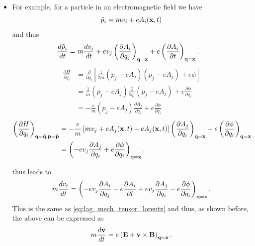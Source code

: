 \documentclass[oneside,a4paper,11pt]{report}
\begin{document}
\begin{itemize}
\item For example, for a particle in an electromagnetic field we have
\begin{equation}
\tilde{p}_i = mv_i + e A_i(\mathbf{x},t)
\end{equation}
and thus
\begin{align}
\frac{d \tilde{p}_i}{dt} & = m \frac{d v_i}{dt} + e v_j \left ( \frac{\partial A_i}{\partial q_j} \right)_{\mathbf{q} = \mathbf{x}} + e \left ( \frac{ \partial A_i}{\partial t} \right)_{\mathbf{q} = \mathbf{x}}.
\end{align}
\begin{align}
\frac{\partial H}{\partial q_i} &= \frac{\partial}{\partial q_i} \left [ \frac{1}{2m} (p_j -eA_j) (p_j -eA_j) + e\phi \right] \nonumber \\
& = \frac{1}{m} (p_j -eA_j) \frac{\partial}{\partial q_i} (p_j - eA_j) + e\frac{\partial \phi}{\partial q_i} \nonumber \\
&  = -\frac{e}{m} (p_j - eA_j) \frac{\partial A_j}{\partial q_i} + e \frac{\partial \phi}{\partial q_i}
\end{align}
\begin{align}
\left ( \frac{ \partial H}{\partial q_i} \right )_{\mathbf{q} = \tilde{\mathbf{q}}, \mathbf{p} = \tilde{\mathbf{p}}} &= -\frac{e}{m} \left [ m v_j + eA_j(\mathbf{x},t) - eA_j(\mathbf{x},t) \right ] \left ( \frac{\partial A_j}{\partial q_i} \right)_{\mathbf{q} = \mathbf{x}} + e \left ( \frac{\partial \phi}{\partial q_i} \right)_{\mathbf{q} = \mathbf{x}} \nonumber \\
& = \left( -e v_j \frac{\partial A_j}{\partial q_i} + e \frac{ \partial \phi}{\partial q_i} \right)_{\mathbf{q} = \mathbf{x}} .
\end{align}

 thus leads to
\begin{equation}
m \frac{d v_i}{dt} = \left ( -e v_j \frac{ \partial A_i}{\partial q_j} - e \frac{ \partial A_i}{\partial t} + e v_j \frac{ \partial A_j}{\partial q_i} - e \frac{ \partial \phi}{\partial q_i} \right)_{\mathbf{q} = \mathbf{x}}.
\end{equation}
This is the same as \cref{eq:lag_mech_tensor_lorentz} and thus, as shown before, the above can be expressed as
\begin{equation}
\label{eq:single_particle_classical_mechanics}
m \frac{d \mathbf{v}}{dt} = e \left ( \mathbf{E} + \mathbf{v} \times \mathbf{B} \right)_{\mathbf{q} = \mathbf{x}}.
\end{equation}

\end{itemize}

\end{document}
